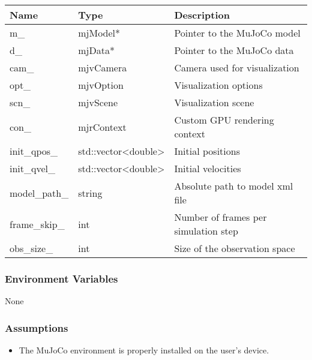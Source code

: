 \documentclass[12pt, titlepage]{article}
\begin{document}
\begin{center}
  \begin{tabular}{p{4cm} p{4cm} p{4cm}}
    \hline
    \textbf{Name} & \textbf{Type} & \textbf{Description} \\
    \hline
    m\_ & mjModel* & Pointer to the MuJoCo model\\
    \hline
    d\_ & mjData* & Pointer to the MuJoCo data\\
    \hline
    cam\_ & mjvCamera & Camera used for visualization\\
    \hline
    opt\_ & mjvOption & Visualization options\\
    \hline
    scn\_ & mjvScene & Visualization scene\\
    \hline
    con\_ & mjrContext & Custom GPU rendering context\\
    \hline
    init\_qpos\_ & std::vector<double> & Initial positions\\
    \hline
    init\_qvel\_ & std::vector<double> & Initial velocities\\
    \hline
    model\_path\_ & string & Absolute path to model xml file\\
    \hline
    frame\_skip\_ & int & Number of frames per simulation step\\
    \hline
    obs\_size\_ & int & Size of the observation space\\
    \hline
  \end{tabular}
\end{center}

\subsubsection{Environment Variables}
None

\subsubsection{Assumptions}
\begin{itemize}
  \item The MuJoCo environment is properly installed on the user's device.
\end{itemize}
\end{document}
